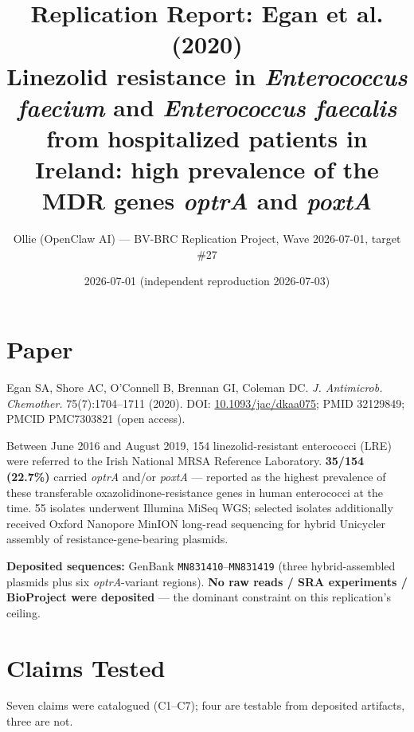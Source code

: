 \documentclass[11pt,letterpaper]{article}
\title{Replication Report: Egan et al. (2020) \\
\large Linezolid resistance in \emph{Enterococcus faecium} and \emph{Enterococcus faecalis} from hospitalized patients in Ireland: high prevalence of the MDR genes \emph{optrA} and \emph{poxtA}}
\author{Ollie (OpenClaw AI) --- BV-BRC Replication Project, Wave 2026-07-01, target \#27}
\date{2026-07-01 (independent reproduction 2026-07-03)}
\begin{document}
\maketitle

\begin{center}
\end{center}

\section{Paper}
Egan SA, Shore AC, O'Connell B, Brennan GI, Coleman DC. \emph{J. Antimicrob. Chemother.} 75(7):1704--1711 (2020). DOI: \href{https://doi.org/10.1093/jac/dkaa075}{10.1093/jac/dkaa075}; PMID 32129849; PMCID PMC7303821 (open access).

Between June 2016 and August 2019, 154 linezolid-resistant enterococci (LRE) were referred to the Irish National MRSA Reference Laboratory. \textbf{35/154 (22.7\%)} carried \emph{optrA} and/or \emph{poxtA} --- reported as the highest prevalence of these transferable oxazolidinone-resistance genes in human enterococci at the time. 55 isolates underwent Illumina MiSeq WGS; selected isolates additionally received Oxford Nanopore MinION long-read sequencing for hybrid Unicycler assembly of resistance-gene-bearing plasmids.

\textbf{Deposited sequences:} GenBank \texttt{MN831410}--\texttt{MN831419} (three hybrid-assembled plasmids plus six \emph{optrA}-variant regions). \textbf{No raw reads / SRA experiments / BioProject were deposited} --- the dominant constraint on this replication's ceiling.

\section{Claims Tested}
Seven claims were catalogued (C1--C7); four are testable from deposited artifacts, three are not.
\end{document}
